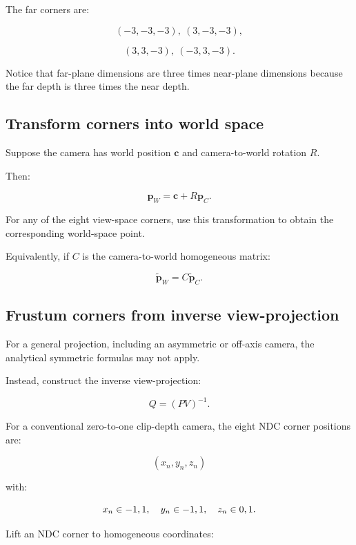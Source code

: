 The far corners are:

\[
 (-3,-3,-3),\ (3,-3,-3),
\]

\[
 (3,3,-3),\ (-3,3,-3).
\]

Notice that far-plane dimensions are three times near-plane dimensions because the far depth is three times the near depth.

\subsection{Transform corners into world space}\label{02-foundations-ii-ch034-transform-corners-into-world-space}

Suppose the camera has world position \(\mathbf c\) and camera-to-world rotation \(R\).

Then:

\[
 \boxed{ \mathbf p_W=\mathbf c+R\mathbf p_C }.
\]

For any of the eight view-space corners, use this transformation to obtain the corresponding world-space point.

Equivalently, if \(C\) is the camera-to-world homogeneous matrix:

\[
 \boxed{ \tilde{\mathbf p}_W=C\tilde{\mathbf p}_C }.
\]

\subsection{Frustum corners from inverse view-projection}\label{02-foundations-ii-ch034-frustum-corners-from-inverse-view-projection}

For a general projection, including an asymmetric or off-axis camera, the analytical symmetric formulas may not apply.

Instead, construct the inverse view-projection:

\[
 \boxed{ Q=(PV)^{-1} }.
\]

For a conventional zero-to-one clip-depth camera, the eight NDC corner positions are:

\[
 (x_n,y_n,z_n)
\]

with:

\[
 x_n\in\\{-1,1\\},\quad y_n\in\\{-1,1\\},\quad z_n\in\\{0,1\\}.
\]

Lift an NDC corner to homogeneous coordinates:

